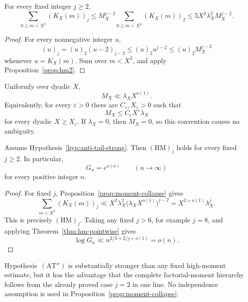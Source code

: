 \begin{proposition}
\label{prop:moment-collapse}
For every fixed integer \(j\ge2\),
\[
 \sum_{0\le m<X^2}(K_X(m))_j
 \le
 M_X^{j-2}
 \sum_{0\le m<X^2}(K_X(m))_2
 \le
 5X^2\lambda_X^2M_X^{j-2}.
\]
\end{proposition}

\begin{proof}
For every nonnegative integer \(u\),
\[
 (u)_j=(u)_2(u-2)_{j-2}
 \le (u)_2u^{j-2}
 \le (u)_2M_X^{j-2}
\]
whenever \(u=K_X(m)\).  Sum over \(m<X^2\), and apply
Proposition~\ref{prop:hm2}.
\end{proof}

\begin{hypothesis}
\label{hyp:anti-tail-strong}
Uniformly over dyadic \(X\),
\[
 M_X\ll \lambda_X X^{o(1)}.
\]
Equivalently, for every \(\varepsilon>0\) there are
\(C_\varepsilon,X_\varepsilon>0\) such that
\[
 M_X\le C_\varepsilon X^\varepsilon\lambda_X
\]
for every dyadic \(X\ge X_\varepsilon\).  If \(\lambda_X=0\),
then \(M_X=0\), so this convention causes no ambiguity.
\end{hypothesis}

\begin{corollary}
\label{cor:anti-tail-full}
Assume Hypothesis~\ref{hyp:anti-tail-strong}.  Then
\((\mathrm{HM})_j\) holds for every fixed \(j\ge2\).  In particular,
\[
 G_n=e^{o(n)}
\qquad(n\to\infty)
\]
for every positive integer \(n\).
\end{corollary}

\begin{proof}
For fixed \(j\), Proposition~\ref{prop:moment-collapse} gives
\[
 \sum_{m<X^2}(K_X(m))_j
 \ll
 X^2\lambda_X^2
 \bigl(\lambda_XX^{o(1)}\bigr)^{j-2}
 =X^{2+o(1)}\lambda_X^j.
\]
This is precisely \((\mathrm{HM})_j\).  Taking any fixed
\(j>6\), for example \(j=8\), and applying
Theorem~\ref{thm:hm-pointwise} gives
\[
 \log G_n
 \ll n^{2/3+2/j+o(1)}
 =o(n).
\]
\end{proof}

\begin{remark}
Hypothesis~\((\mathrm{AT}'')\) is substantially stronger than any
fixed high-moment estimate, but it has the advantage that the complete
factorial-moment hierarchy follows from the already proved case
\(j=2\) in one line.  No independence assumption is used in
Proposition~\ref{prop:moment-collapse}.
\end{remark}


